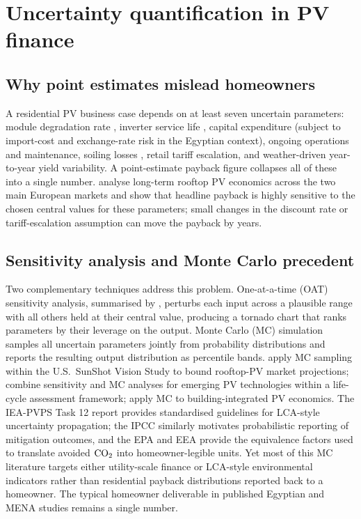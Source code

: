 \section{Uncertainty quantification in PV finance}
\label{sec:lit-uncertainty}

\subsection{Why point estimates mislead homeowners}
\label{sec:lit-uncertainty-point}

A residential PV business case depends on at least seven uncertain
parameters: module degradation rate \citep{jordan2013}, inverter
service life \citep{ieapvps2021}, capital expenditure (subject to
import-cost and exchange-rate risk in the Egyptian context),
ongoing operations and maintenance, soiling losses
\citep{elsayed2017}, retail tariff escalation, and weather-driven
year-to-year yield variability. A point-estimate payback figure
collapses all of these into a single number. \citet{spertino2014}
analyse long-term rooftop PV economics across the two main European
markets and show that headline payback is highly sensitive to the
chosen central values for these parameters; small changes in the
discount rate or tariff-escalation assumption can move the payback by
years.

\subsection{Sensitivity analysis and Monte Carlo precedent}
\label{sec:lit-uncertainty-mc}

Two complementary techniques address this problem. One-at-a-time
(OAT) sensitivity analysis, summarised by \citet{saltelli2008},
perturbs each input across a plausible range with all others held at
their central value, producing a tornado chart that ranks parameters
by their leverage on the output. Monte Carlo (MC) simulation samples
all uncertain parameters jointly from probability distributions and
reports the resulting output distribution as percentile bands.
\citet{drury2012} apply MC sampling within the U.S.\ SunShot Vision
Study to bound rooftop-PV market projections; \citet{lacirignola2017}
combine sensitivity and MC analyses for emerging PV technologies
within a life-cycle assessment framework; \citet{cucchiella2012}
apply MC to building-integrated PV economics. The IEA-PVPS Task 12
report \citep{ieapvps2020} provides standardised guidelines for
LCA-style uncertainty propagation; the IPCC \citep{ipcc-ar6-wg3}
similarly motivates probabilistic reporting of mitigation outcomes,
and the EPA \citep{epa-equivalencies} and EEA
\citep{eea-passenger-cars} provide the equivalence factors used to
translate avoided $\mathrm{CO_{2}}$ into homeowner-legible units. Yet most of
this MC literature targets either utility-scale finance or LCA-style
environmental indicators rather than residential payback
distributions reported back to a homeowner. The typical homeowner
deliverable in published Egyptian and MENA studies remains a single
number.

